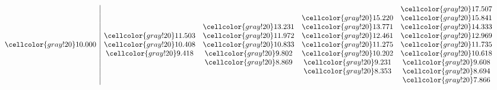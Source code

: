 \begin{example}
\[
\begin{array}{c|cccccc}
 & & & &  \cellcolor{gray!20}17.507 & & \\
 & & & \cellcolor{gray!20}15.220 & \cellcolor{gray!20}15.841 & & \\
 & & \cellcolor{gray!20}13.231 & \cellcolor{gray!20}13.771 & \cellcolor{gray!20}14.333 & & \\
 & \cellcolor{gray!20}11.503 & \cellcolor{gray!20}11.972 & \cellcolor{gray!20}12.461 & \cellcolor{gray!20}12.969 & & \\
\cellcolor{gray!20}10.000 & \cellcolor{gray!20}10.408 & \cellcolor{gray!20}10.833 & \cellcolor{gray!20}11.275 & \cellcolor{gray!20}11.735 & & \\
 & \cellcolor{gray!20}9.418 & \cellcolor{gray!20}9.802 & \cellcolor{gray!20}10.202 & \cellcolor{gray!20}10.618 & & \\
 & & \cellcolor{gray!20}8.869 & \cellcolor{gray!20}9.231 & \cellcolor{gray!20}9.608 & & \\
 & & & \cellcolor{gray!20}8.353 & \cellcolor{gray!20}8.694 & & \\
 & & & & \cellcolor{gray!20}7.866 & &
\end{array}
\]


\end{example}
